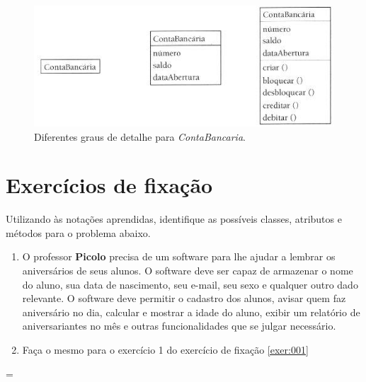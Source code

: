 \begin{figure}[H]
	\centering
	\includegraphics[scale=0.5]{imagens/exemplo-classe-conta-bancaria.png}
	\caption{Diferentes graus de detalhe para \textit{ContaBancaria}.}
	\label{fig:exemplo-classe-conta-bancaria}
\end{figure}

\section{Exercícios de fixação}

Utilizando às notações aprendidas, identifique as possíveis classes, atributos e métodos para o problema abaixo.

\begin{enumerate}
	\item O professor \textbf{Picolo} precisa de um software para lhe ajudar a lembrar os aniversários de seus alunos. O software deve ser capaz de armazenar o nome do aluno, sua data de nascimento, seu e-mail, seu sexo e qualquer outro dado relevante. O software deve permitir o cadastro dos alunos, avisar quem faz aniversário no dia, calcular e mostrar a idade do aluno, exibir um relatório de aniversariantes no mês e outras funcionalidades que se julgar necessário.
	\item Faça o mesmo para o exercício 1 do exercício de fixação \ref{exer:001}
\end{enumerate}=